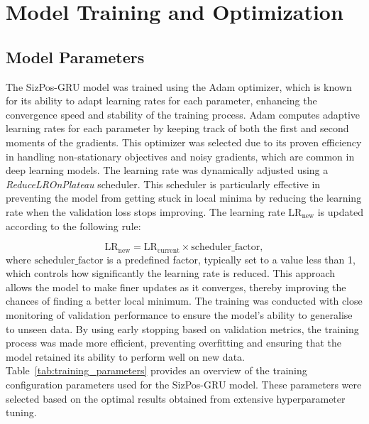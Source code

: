 \documentclass[12pt,oneside]{book} %
\begin{document}
\section{Model Training and Optimization}
\subsection*{Model Parameters}
\noindent The SizPos-GRU model was trained using the Adam optimizer, which is known for
its ability to adapt learning rates for each parameter, enhancing the
convergence speed and stability of the training process. Adam computes adaptive
learning rates for each parameter by keeping track of both the first and second
moments of the gradients. This optimizer was selected due to its proven
efficiency in handling non-stationary objectives and noisy gradients, which are
common in deep learning models. The learning rate was dynamically adjusted
using a \textit{ReduceLROnPlateau} scheduler. This scheduler is particularly
effective in preventing the model from getting stuck in local minima by
reducing the learning rate when the validation loss stops improving. The
learning rate \(\text{LR}_{\text{new}}\) is updated according to the following
rule:

\begin{equation}
    \text{LR}_{\text{new}} = \text{LR}_{\text{current}} \times \text{scheduler\_factor},
\end{equation}
where \(\text{scheduler\_factor}\) is a predefined factor, typically set to a
value less than 1, which controls how significantly the learning rate is
reduced. This approach allows the model to make finer updates as it converges,
thereby improving the chances of finding a better local minimum. The training
was conducted with close monitoring of validation performance to ensure the
model's ability to generalise to unseen data. By using early stopping based on
validation metrics, the training process was made more efficient, preventing
overfitting and ensuring that the model retained its ability to perform well on
new data. Table~\ref{tab:training_parameters} provides an overview of the
training configuration parameters used for the SizPos-GRU model. These
parameters were selected based on the optimal results obtained from extensive
hyperparameter tuning.
\end{document}

